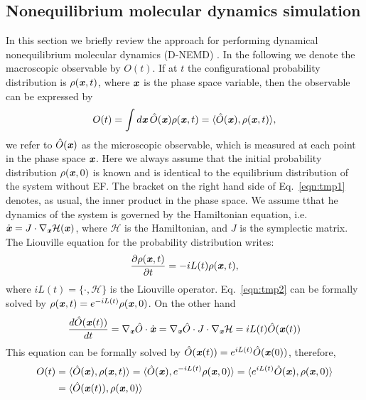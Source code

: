 \documentclass[a4paper,preprint,unsortedaddress,onecolumn]{revtex4-1}
\newcommand{\vect}[1]{\textbf{\textit{#1}}}
\begin{document}
\subsection{Nonequilibrium molecular dynamics simulation}
In this section we briefly review the approach for performing dynamical nonequilibrium
molecular dynamics (D-NEMD) \cite{ciccotti1975direct, ciccotti1979thought,
  orlandini2011hydrodynamics, orlandini2011hydrodynamics-01}.
In the following we denote the macroscopic observable by $O(t)$. If at $t$
the configurational probability distribution is $\rho(\vect x, t)$, where
$\vect x$ is the phase space variable, then the observable can be
expressed by
\begin{align}\label{eqn:tmp1}
  O(t) = \int d\vect x\, \hat O(\vect x)\rho(\vect x, t)  = \langle \hat O(\vect x), \rho(\vect x, t)\rangle,
\end{align}
we refer to $\hat O (\vect x)$ as the microscopic observable, 
which is measured at each point in the phase space $\vect x$.
Here we always assume that the initial probability distribution
$\rho(\vect x, 0)$ is known and is identical to the equilibrium distribution of the system
without EF.
The bracket on the right hand side of Eq.~\eqref{eqn:tmp1} denotes, as usual, the inner product in the
phase space.  We assume tthat he dynamics of the system is governed by the
Hamiltonian equation, i.e. $\dot {\vect x} = J \cdot \nabla_{\vect x}
\mathcal H(\vect x)$, where $\mathcal H$ is the Hamiltonian, and $J$ is
the symplectic matrix. The Liouville equation for the probability
distribution writes:
\begin{align}\label{eqn:tmp2}
  \frac{\partial \rho(\vect x, t)}{\partial t} = - iL(t) \rho(\vect x, t),
\end{align}
where $iL(t) = \{\cdot, \mathcal H\}$ is the Liouville operator.
Eq.~\eqref{eqn:tmp2}
can be formally solved by $\rho(\vect x, t) = e^{-iL(t)} \rho(\vect x, 0)$.
On the other hand
\begin{align}
  \frac{d \hat O(\vect x(t))}{dt} = \nabla_{\vect x}\hat O\cdot \dot{\vect x}
  = \nabla_{\vect x}\hat O\cdot J\cdot \nabla_{\vect x}\mathcal H
  = iL(t) \hat O (\vect x(t))
\end{align}
This equation can be formally solved by $\hat O(\vect x(t)) = e^{iL(t)} \hat O(\vect x(0))$, therefore,
\begin{align}\nonumber
  O(t) & = \langle \hat O(\vect x), \rho(\vect x, t)\rangle
  = \langle \hat O(\vect x), e^{-iL(t)} \rho(\vect x, 0)\rangle
  = \langle e^{iL(t)}\hat O(\vect x), \rho(\vect x, 0)\rangle\\\label{eqn:tmp4}
  &= \langle \hat O(\vect x(t)), \rho(\vect x, 0)\rangle
\end{align}
\end{document}
